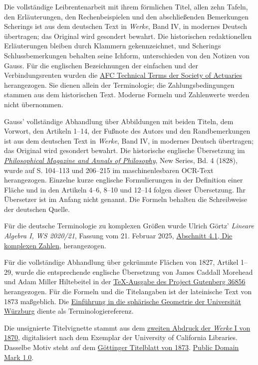 \par\medskip\noindent Die vollständige Leibrentenarbeit mit ihrem förmlichen Titel, allen zehn Tafeln, den Erläuterungen, den Rechenbeispielen und den abschließenden Bemerkungen Scherings ist aus dem deutschen Text in \textit{Werke}, Band IV, in modernes Deutsch übertragen; das Original wird gesondert bewahrt. Die historischen redaktionellen Erläuterungen bleiben durch Klammern gekennzeichnet, und Scherings Schlussbemerkungen behalten seine Ichform, unterschieden von den Notizen von Gauss. Für die englischen Bezeichnungen der einfachen und der Verbindungsrenten wurden die \href{https://afc.soa.org/}{AFC Technical Terms der Society of Actuaries} herangezogen. Sie dienen allein der Terminologie; die Zahlungsbedingungen stammen aus dem historischen Text. Moderne Formeln und Zahlenwerte werden nicht übernommen.
\par\medskip\noindent Gauss' vollständige Abhandlung über Abbildungen mit beiden Titeln, dem Vorwort, den Artikeln 1--14, der Fußnote des Autors und den Randbemerkungen ist aus dem deutschen Text in \textit{Werke}, Band IV, in modernes Deutsch übertragen; das Original wird gesondert bewahrt. Die historische englische Übersetzung im \href{https://archive.org/details/philosophicalmax04lond}{\textit{Philosophical Magazine and Annals of Philosophy}}, New Series, Bd. 4 (1828), wurde auf S. 104--113 und 206--215 im maschinenlesbaren OCR-Text herangezogen. Einzelne kurze englische Formulierungen in der Definition einer Fläche und in den Artikeln 4--6, 8--10 und 12--14 folgen dieser Übersetzung. Ihr Übersetzer ist im Anfang nicht genannt. Die Formeln behalten die Schreibweise der deutschen Quelle.
\par\medskip\noindent Für die deutsche Terminologie zu komplexen Größen wurde Ulrich Görtz' \textit{Lineare Algebra I, WS 2020/21}, Fassung vom 21. Februar 2025, \href{https://math.ug/la1-ws2021/sect0017.html}{Abschnitt 4.1, Die komplexen Zahlen}, herangezogen.
\par\medskip\noindent Für die vollständige Abhandlung über gekrümmte Flächen von 1827, Artikel 1--29, wurde die entsprechende englische Übersetzung von James Caddall Morehead und Adam Miller Hiltebeitel in der \href{https://www.gutenberg.org/ebooks/36856}{TeX-Ausgabe des Project Gutenberg 36856} herangezogen. Für die Formeln und die Titelangaben ist der lateinische Text von 1873 maßgeblich. Die \href{https://www.didaktik.mathematik.uni-wuerzburg.de/projekt/mathei/kugelgeo/einfuehr.html}{Einführung in die sphärische Geometrie der Universität Würzburg} diente als Terminologiereferenz.
\par\medskip\noindent Die unsignierte Titelvignette stammt aus dem \href{https://commons.wikimedia.org/w/index.php?oldid=1179960952}{zweiten Abdruck der \textit{Werke} I von 1870}, digitalisiert nach dem Exemplar der University of California Libraries. Dasselbe Motiv steht auf dem \href{https://gdz.sub.uni-goettingen.de/id/PPN236005081}{Göttinger Titelblatt von 1873}. \href{https://creativecommons.org/publicdomain/mark/1.0/}{Public Domain Mark 1.0}.
\par\endgroup\clearpage
